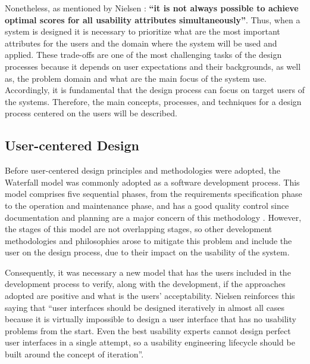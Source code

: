 Nonetheless, as mentioned by Nielsen \cite{usabilityEngineering}: \textbf{“it is not always possible to achieve optimal scores for all usability attributes simultaneously”}. Thus, when a system is designed it is necessary to prioritize what are the most important attributes for the users and the domain where the system will be used and applied. These trade-offs are one of the most challenging tasks of the design processes because it depends on user expectations and their backgrounds, as well as, the problem domain and what are the main focus of the system use. Accordingly, it is fundamental that the design process can focus on target users of the systems. Therefore, the main concepts, processes, and techniques for a design process centered on the users will be described.






\subsection{User-centered Design}
\label{subsec:user_centered_design}
Before user-centered design principles and methodologies were adopted, the Waterfall model was commonly adopted as a software development process. This model comprises five sequential phases, from the requirements specification phase to the operation and maintenance phase, and has a good quality control since documentation and planning are a major concern of this methodology \cite{aComparisonBetweenThreeSDLCModelsWatterfallSpiralIncrementalIterative}. However, the stages of this model are not overlapping stages, so other development methodologies and philosophies arose to mitigate this problem and include the user on the design process, due to their impact on the usability of the system.

Consequently, it was necessary a new model that has the users included in the development process to verify, along with the development, if the approaches adopted are positive and what is the users' acceptability. Nielsen \cite{iterativeUserInterfaceDesign} reinforces this saying that “user interfaces should be designed iteratively in almost all cases because it is virtually impossible to design a user interface that has no usability problems from the start. Even the best usability experts cannot design perfect user interfaces in a single attempt, so a usability engineering lifecycle should be built around the concept of iteration”.

